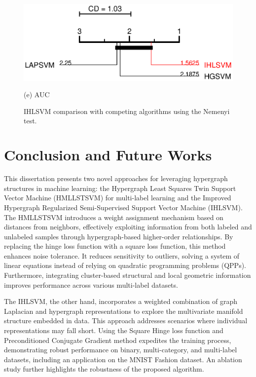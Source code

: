 \documentclass[12pt,a4paper,oneside,english]{report}
\begin{document}
\begin{figure}[t!]
    \begin{minipage}[t]{0.5\textwidth}
        \centering
        \includegraphics[width=0.9\linewidth]{Figures/chp4/AUC_IHLSVM.eps}
        \caption*{(e) AUC}
        \label{figauc_IHLSVM}
    \end{minipage}
    \caption{IHLSVM comparison with competing algorithms using the Nemenyi test.}
    \label{figcd_IHLSVM}
\end{figure}







\newpage
\chapter{Conclusion and Future Works}
This dissertation presents two novel approaches for leveraging hypergraph structures in machine learning: the Hypergraph Least Squares Twin Support Vector Machine (HMLLSTSVM) for multi-label learning and the Improved Hypergraph Regularized Semi-Supervised Support Vector Machine (IHLSVM). The HMLLSTSVM introduces a weight assignment mechanism based on distances from neighbors, effectively exploiting information from both labeled and unlabeled samples through hypergraph-based higher-order relationships. By replacing the hinge loss function with a square loss function, this method enhances noise tolerance. It reduces sensitivity to outliers, solving a system of linear equations instead of relying on quadratic programming problems (QPPs). Furthermore, integrating cluster-based structural and local geometric information improves performance across various multi-label datasets.

The IHLSVM, the other hand, incorporates a weighted combination of graph Laplacian and hypergraph representations to explore the multivariate manifold structure embedded in data. This approach addresses scenarios where individual representations may fall short. Using the Square Hinge loss function and Preconditioned Conjugate Gradient method expedites the training process, demonstrating robust performance on binary, multi-category, and multi-label datasets, including an application on the MNIST Fashion dataset. An ablation study further highlights the robustness of the proposed algorithm.
\end{document}
